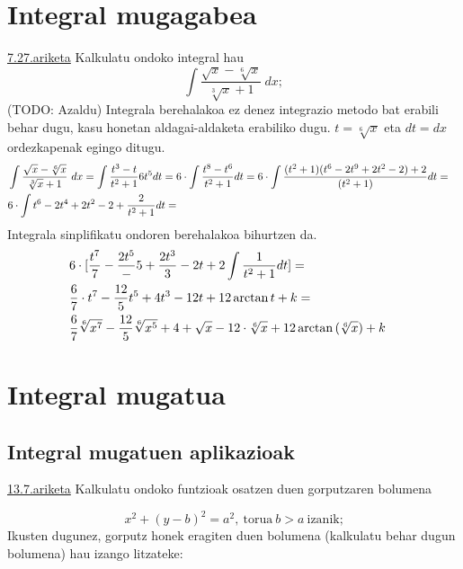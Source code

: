 \chapter{Integral mugagabea}
\underline{7.27.ariketa} Kalkulatu ondoko integral hau
\begin{equation*}
    \int \frac{\sqrt{x}-\sqrt[6]{x}}{\sqrt[3]{x}+1}\ dx;
\end{equation*}
(TODO: Azaldu)
Integrala berehalakoa ez denez integrazio metodo bat erabili behar dugu, kasu honetan aldagai-aldaketa erabiliko dugu. $t=\sqrt[6]{x}$ eta $dt=dx$ ordezkapenak egingo ditugu.
\begin{equation*}
    \begin{split}
    &\int \frac{\sqrt{x}-\sqrt[6]{x}}{\sqrt[3]{x}+1}\ dx = \int \frac{t^3-t}{t^2+1}6t^5dt = 6 \cdot \int \frac{t^8-t^6}{t^2+1}dt =
     6 \cdot \int \frac{(t^2+1)(t^6-2t^9+2t^2-2)+2}{(t^2+1)}dt = & 
     \cr &6 \cdot \int t^6-2t^4+2t^2-2+\frac{2}{t^2+1}dt = &
     \end{split}
\end{equation*}
Integrala sinplifikatu ondoren berehalakoa bihurtzen da.
\begin{equation*}
     \begin{split}
         &6 \cdot                  [\frac{t^7}{7}-\frac{2t^5}-{5}+\frac{2t^3}{3}-2t+2\int \frac{1}{t^2+1}dt] = &
         \cr & \frac{6}{7} \cdot t^7 - \frac{12}{5}t^5+4t^3-12t+12\arctan{t} + k = &
         \cr &\frac{6}{7} \sqrt[6]{x^7}-\frac{12}{5}\sqrt[6]{x^5}+4+\sqrt{x}-12\cdot\sqrt[6]{x}+12\arctan{(\sqrt[6]{x})}+k&
    \end{split}
\end{equation*}




\chapter{Integral mugatua}
\section{Integral mugatuen aplikazioak}
\underline{13.7.ariketa} Kalkulatu ondoko funtzioak osatzen duen gorputzaren bolumena

\begin{equation*}
    x^2+(y-b)^2=a^2,\ \text{torua}\ b>a \ \text{izanik;}
    \end{equation*}
    \newline
    Ikusten dugunez, gorputz honek eragiten duen bolumena (kalkulatu behar dugun bolumena) hau izango litzateke:

